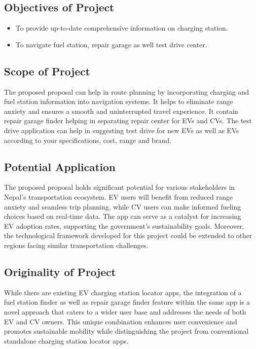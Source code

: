 \newpage
\subsection{Objectives of Project}
\begin{itemize}
    \item To provide up-to-date comprehensive information on charging station.
    \item To navigate fuel station, repair garage as well test drive center.
\end{itemize}

\subsection{Scope of Project}
The proposed proposal can help in route planning by incorporating charging and fuel station information into navigation systems. It  helps to eliminate range anxiety and ensures a smooth and uninterrupted travel experience. It contain repair garage finder helping in separating repair center for EVs and CVs. The test drive application can help in suggesting test drive for new EVs as well as EVs according to your specifications, cost, range and brand.

\subsection{Potential Application}
The proposed proposal holds significant potential for various stakeholders in Nepal's transportation ecosystem. EV users will benefit from reduced range anxiety and seamless trip planning, while CV users can make informed fueling choices based on real-time data. The app can serve as a catalyst for increasing EV adoption rates, supporting the government's sustainability goals. Moreover, the technological framework developed for this project could be extended to other regions facing similar transportation challenges.

\newpage
\subsection{Originality of Project}
While there are existing EV charging station locator apps, the integration of a fuel station finder as well as repair garage finder feature within the same app is a novel approach that caters to a wider user base and addresses the needs of both EV and CV owners. This unique combination enhances user convenience and promotes sustainable mobility while distinguishing the project from conventional standalone charging station locator apps.

